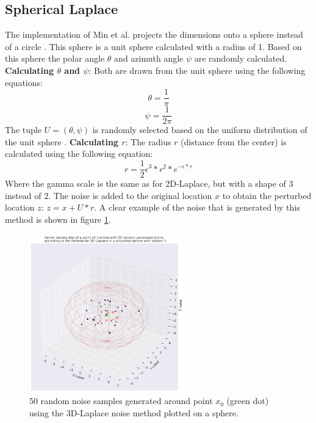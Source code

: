 \subsection{Spherical Laplace}
The implementation of Min et al. projects the dimensions onto a sphere instead of a circle \citep{9646489}.
This sphere is a unit sphere calculated with a radius of 1.
Based on this sphere the polar angle $\theta$ and azimuth angle $\psi$ are randomly calculated. \newline
\textbf{Calculating $\theta$ and $\psi$}: Both are drawn from the unit sphere using the following equations:
\begin{equation}
  \theta = \frac{1}{\pi}
\end{equation}
\begin{equation}
  \psi = \frac{1}{2\pi}
\end{equation}
The tuple $U = (\theta, \psi)$ is randomly selected based on the uniform distribution of the unit sphere \citep{9646489}. \newline
\textbf{Calculating $r$}: The radius $r$ (distance from the center) is calculated using the following equation:
\begin{equation}
  r = \frac{1}{2}\epsilon^3 * r^2 * e^{-\epsilon * r}
\end{equation}
Where the gamma scale is the same as for 2D-Laplace, but with a shape of 3 instead of 2.
The noise is added to the original location $x$ to obtain the perturbed location $z$: $z = x + U*r$.
A clear example of the noise that is generated by this method is shown in figure \ref{fig:3d-laplace-noise}.
\begin{figure}
  \includegraphics[width=0.6\textwidth]{TheorethicalFramework/ND-Laplace/Images/3d_laplace_noise.png}
  \caption{50 random noise samples generated around point $x_0$ (green dot) using the 3D-Laplace noise method \citep{9646489} plotted on a sphere.}
  \label{fig:3d-laplace-noise}
\end{figure}
